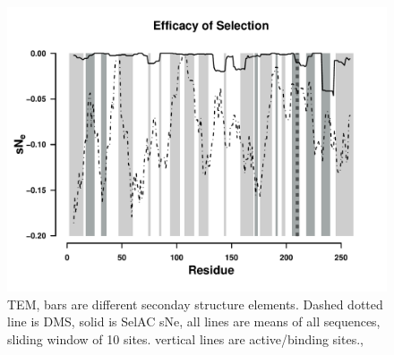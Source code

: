 \documentclass[12pt]{article}
\begin{document}
\begin{figure}[H]
     \centering
	\includegraphics[width=\textwidth]{img/sNe_slide_TEM2016}
	\caption{TEM, bars are different seconday structure elements. Dashed dotted line is DMS, solid is SelAC sNe, all lines are means of all sequences, sliding window of 10 sites. vertical lines are active/binding sites.,}
	\label{fig:tem2016_sse}
\end{figure}
\end{document}
